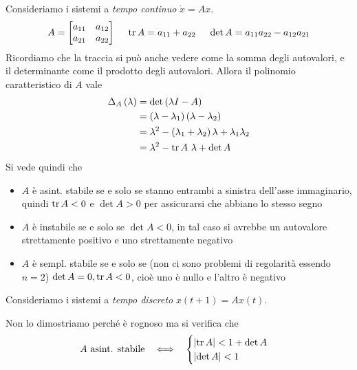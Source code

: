 Consideriamo i sistemi a \textit{tempo continuo} $\dot{x} =Ax$.
\begin{equation*}
	A=\begin{bmatrix}
	a_{11} & a_{12}\\
	a_{21} & a_{22}
	\end{bmatrix} \ \ \ \ \operatorname{tr} A=a_{11} +a_{22} \ \ \ \ \det A=a_{11} a_{22} -a_{12} a_{21}
\end{equation*}
Ricordiamo che la traccia si può anche vedere come la somma degli autovalori, e il determinante come il prodotto degli autovalori. Allora il polinomio caratteristico di $A$ vale
\begin{equation*}
	\begin{aligned}
		\Delta _A\left(\lambda \right) & =\det\left(\lambda I-A\right)                                                   \\
		                               & =\left(\lambda -\lambda _1\right)\left(\lambda -\lambda _2\right)               \\
		                               & =\lambda ^2 -\left(\lambda _1 +\lambda _2\right) \lambda +\lambda _1 \lambda _2 \\
		                               & =\lambda ^2 -\operatorname{tr} A\ \lambda +\det A                                             
	\end{aligned}
\end{equation*}
Si vede quindi che
\begin{itemize}
	\item $A$ è asint. stabile se e solo se stanno entrambi a sinistra dell'asse immaginario, quindi $\operatorname{tr} A< 0$ e $\det A >0$ per assicurarsi che abbiano lo stesso segno
	\item $A$ è instabile se e solo se $\det A< 0$, in tal caso si avrebbe un autovalore strettamente positivo e uno strettamente negativo
	\item $A$ è sempl. stabile se e solo se (non ci sono problemi di regolarità essendo $n=2$) $\det A=0,\operatorname{tr} A< 0$, cioè uno è nullo e l'altro è negativo
\end{itemize}

Consideriamo i sistemi a \textit{tempo discreto} $x\left(t+1\right) =Ax\left(t\right)$.

Non lo dimostriamo perché è rognoso ma si verifica che
\begin{equation*}
	A\ \text{asint. stabile} \ \ \iff \ \ \begin{cases}
	\left| \tr A\right| < 1+\det A\\
	\left| \det A\right| < 1
	\end{cases}
\end{equation*}

